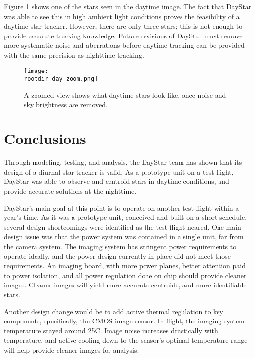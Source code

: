 \documentclass[twocolumn,letterpaper]{IEEEAerospace2012}
\newcommand{\rootdir}{./Figures/}
\begin{document}
Figure \ref{fig:day_zoom} shows one of the stars seen in the daytime image. The fact that DayStar was able to see this in high ambient light conditions proves the feasibility of a daytime star tracker. However, there are only three stars; this is not enough to provide accurate tracking knowledge. Future revisions of DayStar must remove more systematic noise and aberrations before daytime tracking can be provided with the same precision as nighttime tracking.
\begin{figure}[H]
    \centering
    \texttt{[image: \\rootdir day\_zoom.png]}
    \caption{A zoomed view shows what daytime stars look like, once noise and sky brightness are removed.}
    \label{fig:day_zoom}
\end{figure}


\section{Conclusions}
Through modeling, testing, and analysis, the DayStar team has shown that its design of a diurnal star tracker is valid. As a prototype unit on a test flight, DayStar was able to observe and centroid stars in daytime conditions, and provide accurate solutions at the nighttime.

DayStar's main goal at this point is to operate on another test flight within a year's time. As it was a prototype unit, conceived and built on a short schedule, several design shortcomings were identified as the test flight neared. One main design issue was that the power system was contained in a single unit, far from the camera system. The imaging system has stringent power requirements to operate ideally, and the power design currently in place did not meet those requirements. An imaging board, with more power planes, better attention paid to power isolation, and all power regulation done on chip should provide cleaner images. Cleaner images will yield more accurate centroids, and more identifiable stars.

Another design change would be to add active thermal regulation to key components, specifically, the CMOS image sensor. In flight, the imaging system temperature stayed around 25C. Image noise increases drastically with temperature, and active cooling down to the sensor's optimal temperature range will help provide cleaner images for analysis.
\end{document}
